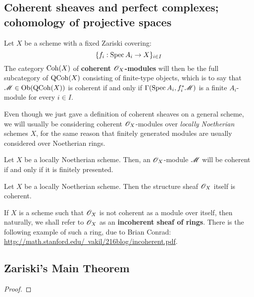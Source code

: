         \subsection{Coherent sheaves and perfect complexes; cohomology of projective spaces}
            \begin{definition} \label{def: coherent_modules}
                Let $X$ be a scheme with a fixed Zariski covering:
                    $$\{ f_i: \operatorname{Spec} A_i \to X \}_{i \in I}$$
                The category $\mathrm{Coh}(X)$ of \textbf{coherent $\mathscr{O}_X$-modules} will then be the full subcategory of $\mathrm{QCoh}(X)$ consisting of finite-type objects, which is to say that $\mathscr{M} \in \mathrm{Ob}( \mathrm{QCoh}(X) )$ is coherent if and only if $\Gamma(\operatorname{Spec} A_i, f_i^*\mathscr{M})$ is a finite $A_i$-module for every $i \in I$.
            \end{definition}
            Even though we just gave a definition of coherent sheaves on a general scheme, we will usually be considering coherent $\mathscr{O}_X$-modules over \textit{locally Noetherian} schemes $X$, for the same reason that finitely generated modules are usually considered over Noetherian rings. 
            \begin{proposition} \label{prop: coherent_modules_over_noetherian_schemes}
                Let $X$ be a locally Noetherian scheme. Then, an $\mathscr{O}_X$-module $\mathscr{M}$ will be coherent if and only if it is finitely presented.
            \end{proposition}
            \begin{example}
                Let $X$ be a locally Noetherian scheme. Then the structure sheaf $\mathscr{O}_X$ itself is coherent. 
            \end{example}
            \begin{example}
                If $X$ is a scheme such that $\mathscr{O}_X$ is not coherent as a module over itself, then naturally, we shall refer to $\mathscr{O}_X$ as an \textbf{incoherent sheaf of rings}. There is the following example of such a ring, due to Brian Conrad: \href{http://math.stanford.edu/~vakil/216blog/incoherent.pdf}{http://math.stanford.edu/~vakil/216blog/incoherent.pdf}.
            \end{example}

        \subsection{Zariski's Main Theorem}
            \begin{theorem} \label{theorem: formal_function_theorem}

            \end{theorem}
                \begin{proof}
                    
                \end{proof}

